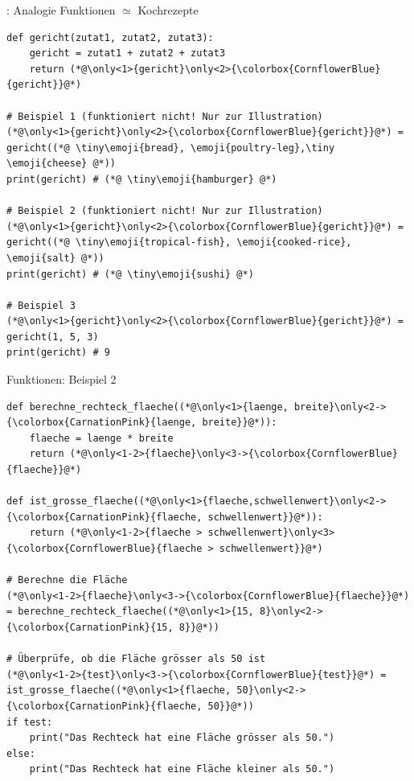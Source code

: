 \begin{frame}[fragile]{: Analogie }
Funktionen $\simeq$ Kochrezepte

\begin{lstlisting}
def gericht(zutat1, zutat2, zutat3):
    gericht = zutat1 + zutat2 + zutat3
    return (*@\only<1>{gericht}\only<2>{\colorbox{CornflowerBlue}{gericht}}@*)

# Beispiel 1 (funktioniert nicht! Nur zur Illustration)
(*@\only<1>{gericht}\only<2>{\colorbox{CornflowerBlue}{gericht}}@*) = gericht((*@ \tiny\emoji{bread}, \emoji{poultry-leg},\tiny \emoji{cheese} @*))
print(gericht) # (*@ \tiny\emoji{hamburger} @*)

# Beispiel 2 (funktioniert nicht! Nur zur Illustration)
(*@\only<1>{gericht}\only<2>{\colorbox{CornflowerBlue}{gericht}}@*) = gericht((*@ \tiny\emoji{tropical-fish}, \emoji{cooked-rice}, \emoji{salt} @*))
print(gericht) # (*@ \tiny\emoji{sushi} @*)

# Beispiel 3    
(*@\only<1>{gericht}\only<2>{\colorbox{CornflowerBlue}{gericht}}@*) = gericht(1, 5, 3)
print(gericht) # 9
\end{lstlisting}
\end{frame}

\begin{frame}[fragile]{Funktionen: Beispiel 2}
\begin{lstlisting}
def berechne_rechteck_flaeche((*@\only<1>{laenge, breite}\only<2->{\colorbox{CarnationPink}{laenge, breite}}@*)):
    flaeche = laenge * breite
    return (*@\only<1-2>{flaeche}\only<3->{\colorbox{CornflowerBlue}{flaeche}}@*)

def ist_grosse_flaeche((*@\only<1>{flaeche,schwellenwert}\only<2->{\colorbox{CarnationPink}{flaeche, schwellenwert}}@*)):
    return (*@\only<1-2>{flaeche > schwellenwert}\only<3>{\colorbox{CornflowerBlue}{flaeche > schwellenwert}}@*)

# Berechne die Fläche
(*@\only<1-2>{flaeche}\only<3->{\colorbox{CornflowerBlue}{flaeche}}@*) = berechne_rechteck_flaeche((*@\only<1>{15, 8}\only<2->{\colorbox{CarnationPink}{15, 8}}@*))

# Überprüfe, ob die Fläche grösser als 50 ist
(*@\only<1-2>{test}\only<3->{\colorbox{CornflowerBlue}{test}}@*) = ist_grosse_flaeche((*@\only<1>{flaeche, 50}\only<2->{\colorbox{CarnationPink}{flaeche, 50}}@*))
if test:
    print("Das Rechteck hat eine Fläche grösser als 50.")
else:
    print("Das Rechteck hat eine Fläche kleiner als 50.")
\end{lstlisting}
\end{frame}

